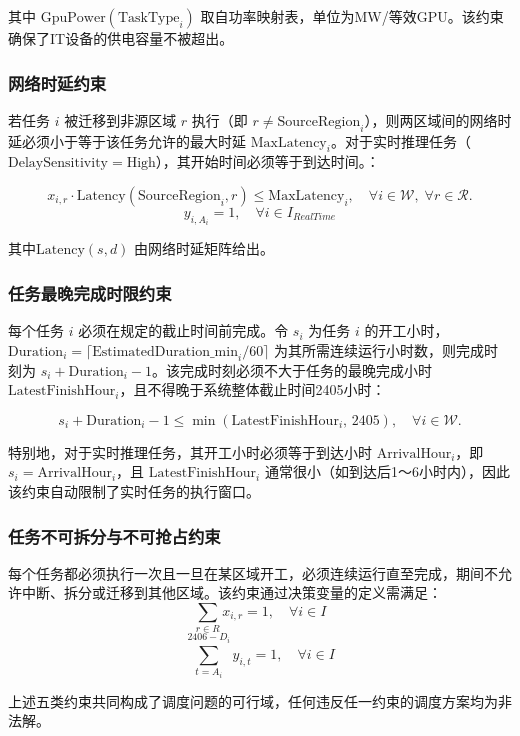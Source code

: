 \documentclass[UTF8,a4paper,zihao=-4]{ctexart}
\begin{document}
其中 \(\mathrm{GpuPower}(\mathrm{TaskType}_i)\) 取自功率映射表，单位为MW/等效GPU。该约束确保了IT设备的供电容量不被超出。

\subsubsection{网络时延约束}
若任务 \(i\) 被迁移到非源区域 \(r\) 执行（即 \(r \neq \mathrm{SourceRegion}_i\)），则两区域间的网络时延必须小于等于该任务允许的最大时延 \(\mathrm{MaxLatency}_i\)。对于实时推理任务（\(\mathrm{DelaySensitivity}=\text{High}\)），其开始时间必须等于到达时间。：

\[
x_{i,r} \cdot \mathrm{Latency}(\mathrm{SourceRegion}_i, r) \leq \mathrm{MaxLatency}_i, \quad \forall i \in \mathcal{W},\; \forall r \in \mathcal{R}.
\]
$$
y_{i, A_i} = 1, \quad \forall i \in I_{RealTime}
$$

其中\(\mathrm{Latency}(s,d)\) 由网络时延矩阵给出。

\subsubsection{任务最晚完成时限约束}
每个任务 \(i\) 必须在规定的截止时间前完成。令 \(s_i\) 为任务 \(i\) 的开工小时，\(\mathrm{Duration}_i = \lceil \mathrm{EstimatedDuration\_min}_i / 60 \rceil\) 为其所需连续运行小时数，则完成时刻为 \(s_i + \mathrm{Duration}_i - 1\)。该完成时刻必须不大于任务的最晚完成小时 \(\mathrm{LatestFinishHour}_i\)，且不得晚于系统整体截止时间2405小时：

\[
s_i + \mathrm{Duration}_i - 1 \leq \min(\mathrm{LatestFinishHour}_i,\, 2405), \quad \forall i \in \mathcal{W}.
\]

特别地，对于实时推理任务，其开工小时必须等于到达小时 \(\mathrm{ArrivalHour}_i\)，即 \(s_i = \mathrm{ArrivalHour}_i\)，且 \(\mathrm{LatestFinishHour}_i\) 通常很小（如到达后1～6小时内），因此该约束自动限制了实时任务的执行窗口。

\subsubsection{任务不可拆分与不可抢占约束}
每个任务都必须执行一次且一旦在某区域开工，必须连续运行直至完成，期间不允许中断、拆分或迁移到其他区域。该约束通过决策变量的定义需满足：
$$
\sum_{r \in R} x_{i, r} = 1, \quad \forall i \in I
$$
$$
\sum_{t = A_i}^{2406 - D_i} y_{i, t} = 1, \quad \forall i \in I
$$

上述五类约束共同构成了调度问题的可行域，任何违反任一约束的调度方案均为非法解。
\end{document}
